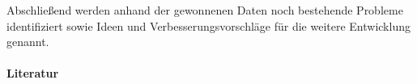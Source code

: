 \documentclass{scrartcl}
\begin{document}
Abschließend werden anhand der gewonnenen Daten noch bestehende Probleme
identifiziert sowie Ideen und Verbesserungsvorschläge für die weitere
Entwicklung genannt.
\\
\\
\vspace*{-2em}\large\textbf{Literatur}
\renewcommand*{\refname}{} 
\vspace*{-1em}
\small


\end{document}
